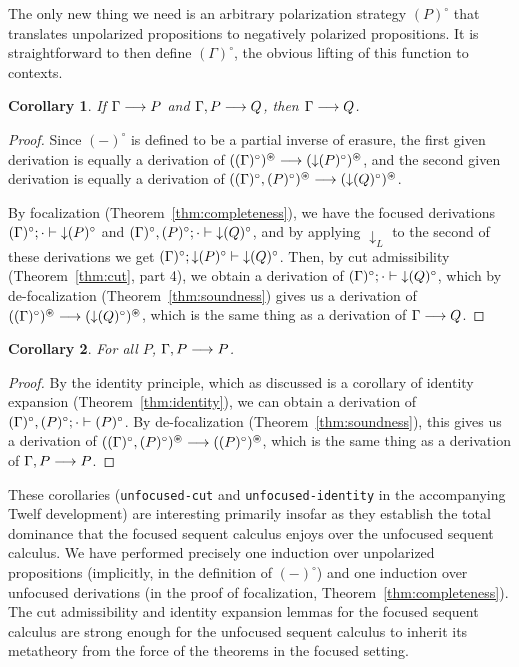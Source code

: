 \documentclass[acmtocl]{robtrans}\pdfoutput=1
\newtheorem{corollary}{Corollary}
\newcommand{\seq}[2]{{#1} \longrightarrow {#2} \mathstrut}
\newcommand{\ifoc}[3]{{#1}; {#2} \vdash {#3} \mathstrut}
\begin{document}
The only new thing we need is an arbitrary polarization strategy
$(P)^\circ$ that translates unpolarized propositions to negatively
polarized propositions. It is straightforward to then define
$(\Gamma)^\circ$, the obvious lifting of this function to
contexts.

\begin{corollary}\label{cor:cut}
If $\seq{\Gamma}{P}$ and $\seq{\Gamma, P}{Q}$, then $\seq{\Gamma}{Q}$.
\end{corollary}

\begin{proof}
Since $(-)^\circ$ is defined to be a partial inverse of erasure,
the first given derivation is equally a derivation of
$\seq{((\Gamma)^\circ)^\circledast}{({\downarrow}(P)^\circ)^\circledast}$, and
the second given derivation is equally a derivation of
$\seq{((\Gamma)^\circ,(P)^\circ)^\circledast}{({\downarrow}(Q)^\circ)^\circledast}$. 

By focalization (Theorem~\ref{thm:completeness}), we have the focused
derivations $\ifoc{(\Gamma)^\circ}{\cdot}{{\downarrow}(P)^\circ}$ and
$\ifoc{(\Gamma)^\circ, (P)^\circ}{\cdot}{{\downarrow}(Q)^\circ}$, and
by applying ${\downarrow}_L$ to the second of these derivations we get
$\ifoc{(\Gamma)^\circ}{{\downarrow}(P)^\circ}{{\downarrow}(Q)^\circ}$.
Then, by cut admissibility (Theorem~\ref{thm:cut}, part 4), we obtain
a derivation of $\ifoc{(\Gamma)^\circ}{\cdot}{{\downarrow}(Q)^\circ}$, which by
de-focalization (Theorem~\ref{thm:soundness}) gives us a derivation of
$\seq{((\Gamma)^\circ)^\circledast}{({\downarrow}(Q)^\circ)^\circledast}$, 
which is the same thing as a derivation of $\seq{\Gamma}{Q}$.
\end{proof}

\clearpage
\begin{corollary}\label{cor:identity}
For all $P$, $\seq{\Gamma, P}{P}$.
\end{corollary}

\begin{proof}
By the identity principle, which as discussed is a corollary of
identity expansion (Theorem~\ref{thm:identity}), we can obtain a
derivation of $\ifoc{(\Gamma)^\circ, (P)^\circ}{\cdot}{(P)^\circ}$. By
de-focalization (Theorem~\ref{thm:soundness}), this gives us a
derivation of $\seq{((\Gamma)^\circ,
  (P)^\circ)^\circledast}{((P)^\circ)^\circledast}$, which is the same thing
as a derivation of $\seq{\Gamma,P}{P}$.
\end{proof}

These corollaries ({\tt unfocused-cut} and {\tt unfocused-identity} 
in the accompanying Twelf development) 
are interesting primarily insofar as they establish the 
total dominance that the focused sequent calculus enjoys over 
the unfocused sequent calculus. We have performed precisely
one induction over unpolarized propositions
(implicitly, in the definition of 
$(-)^\circ$) and one induction over unfocused derivations (in the proof of
focalization, Theorem~\ref{thm:completeness}). 
The cut admissibility and identity
expansion lemmas for the focused sequent calculus are strong enough for the
unfocused sequent calculus to inherit its metatheory from the force
of the theorems in the focused setting.
\end{document}
